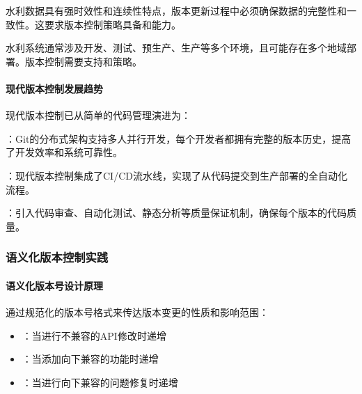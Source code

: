 
水利数据具有强时效性和连续性特点，版本更新过程中必须确保数据的完整性和一致性。这要求版本控制策略具备和能力。


水利系统通常涉及开发、测试、预生产、生产等多个环境，且可能存在多个地域部署。版本控制需要支持和策略。

\hypertarget{ux73b0ux4ee3ux7248ux672cux63a7ux5236ux53d1ux5c55ux8d8bux52bf}{%
\paragraph{现代版本控制发展趋势}\label{ux73b0ux4ee3ux7248ux672cux63a7ux5236ux53d1ux5c55ux8d8bux52bf}}

现代版本控制已从简单的代码管理演进为：

：Git的分布式架构支持多人并行开发，每个开发者都拥有完整的版本历史，提高了开发效率和系统可靠性。

：现代版本控制集成了CI/CD流水线，实现了从代码提交到生产部署的全自动化流程。

：引入代码审查、自动化测试、静态分析等质量保证机制，确保每个版本的代码质量。

\hypertarget{ux8bedux4e49ux5316ux7248ux672cux63a7ux5236ux5b9eux8df5}{%
\subsubsection{语义化版本控制实践}\label{ux8bedux4e49ux5316ux7248ux672cux63a7ux5236ux5b9eux8df5}}

\hypertarget{ux8bedux4e49ux5316ux7248ux672cux53f7ux8bbeux8ba1ux539fux7406}{%
\paragraph{语义化版本号设计原理}\label{ux8bedux4e49ux5316ux7248ux672cux53f7ux8bbeux8ba1ux539fux7406}}

通过规范化的版本号格式来传达版本变更的性质和影响范围：

\begin{itemize}
\tightlist
\item
  ：当进行不兼容的API修改时递增
\item
  ：当添加向下兼容的功能时递增\\
\item
  ：当进行向下兼容的问题修复时递增
\end{itemize}

